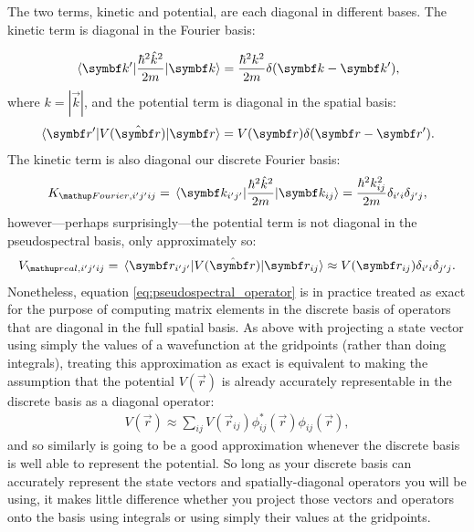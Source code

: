 The two terms, kinetic and potential, are each diagonal in different bases. The kinetic term is diagonal in the Fourier basis:

\begin{align}
\matrixel{\vec k^\prime}{\frac{\hbar^2 \hat k^2}{2m}}{\vec k} = \frac{\hbar^2 k^2}{2m}\delta(\vec k - \vec k^\prime),
\end{align}
where $k = |\vec k|$, and the potential term is diagonal in the spatial basis:
\begin{align}
\matrixel{\vec r^\prime}{V(\hat{\vec r})}{\vec r} = V(\vec r) \delta(\vec r - \vec r^\prime).
\end{align}
The kinetic term is also diagonal our discrete Fourier basis:
\begin{align}
K_{\up{Fourier}, i^\prime j^\prime i j} = \matrixel{\vec k_{i^\prime j^\prime}}{\frac{\hbar^2 \hat k^2}{2m}}{\vec k_{i j}} = \frac{\hbar^2 k_{i j}^2}{2m}\delta_{i^\prime i}\delta_{j^\prime j},
\end{align}
however---perhaps surprisingly---the potential term is not diagonal in the pseudospectral basis, only approximately so:
\begin{align}\label{eq:pseudospectral_operator}
V_{\up{real}, i^\prime j^\prime i j} = \matrixel{\vec r_{i^\prime j^\prime}}{V(\hat{\vec r})}{\vec r_{i j}} \approx V(\vec r_{i j}) \delta_{i^\prime i}\delta_{j^\prime j}.
\end{align}
Nonetheless, equation \eqref{eq:pseudospectral_operator} is in practice treated as exact for the purpose of computing matrix elements in the discrete basis of operators that are diagonal in the full spatial basis. As above with projecting a state vector using simply the values of a wavefunction at the gridpoints (rather than doing integrals), treating this approximation as exact is equivalent to making the assumption that the potential $V(\vec r)$ is already accurately representable in the discrete basis as a diagonal operator:
\begin{align}
V(\vec r) \approx \sum_{ij} V(\vec r_{ij}) \phi^\ast_{ij}(\vec r)\phi_{ij}(\vec r),
\end{align}
and so similarly is going to be a good approximation whenever the discrete basis is well able to represent the potential. So long as your discrete basis can accurately represent the state vectors and spatially-diagonal operators you will be using, it makes little difference whether you project those vectors and operators onto the basis using integrals or using simply their values at the gridpoints.

